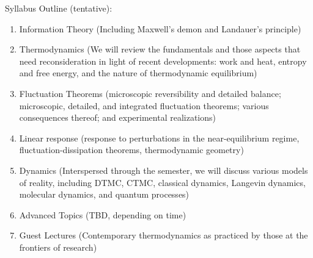 \documentclass[article,notes]{bespoke6}
\begin{document}
Syllabus Outline (tentative):
\begin{enumerate}
  \item Information Theory (Including Maxwell's demon and Landauer's principle)
  \item Thermodynamics (We will review the fundamentals and those aspects that need reconsideration in light of recent developments: work and heat, entropy and free energy, and the nature of thermodynamic equilibrium) 
  \item Fluctuation Theorems (microscopic reversibility and detailed balance; microscopic, detailed, and integrated fluctuation theorems; various consequences thereof; and experimental realizations)
  \item Linear response (response to perturbations in the near-equilibrium regime, fluctuation-dissipation theorems, thermodynamic geometry)
  \item Dynamics (Interspersed through the semester, we will discuss various models of reality, including DTMC, CTMC, classical dynamics, Langevin dynamics, molecular dynamics, and quantum processes)
  \item Advanced Topics (TBD, depending on time)
  \item Guest Lectures (Contemporary thermodynamics as practiced by those at the frontiers of research)
\end{enumerate}

\newpage



\clearpage



\clearpage




\clearpage





\end{document}
